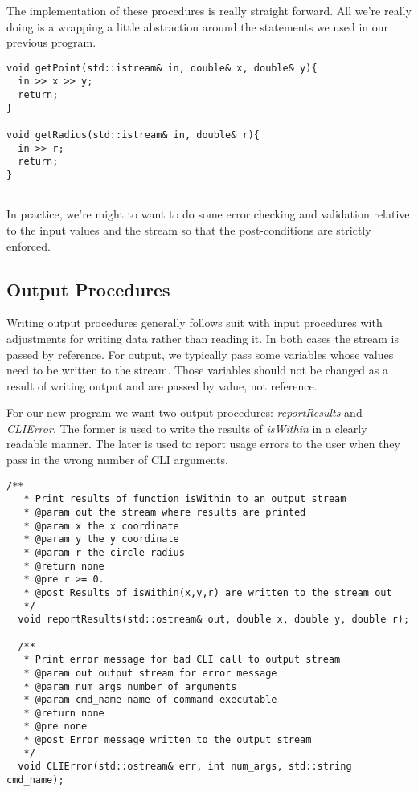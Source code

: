 \documentclass[nobib]{tufte-handout}
\begin{document}
The implementation of these procedures is really straight forward. All we're really doing is a wrapping a little abstraction around the statements we used in our previous program. 
\begin{verbatim}
void getPoint(std::istream& in, double& x, double& y){
  in >> x >> y;
  return;
}

void getRadius(std::istream& in, double& r){
  in >> r;
  return;
}
	
\end{verbatim}
In practice, we're might to want to do some error checking and validation relative to the input values and the stream so that the post-conditions are strictly enforced.

\subsection{Output Procedures}

Writing output procedures generally follows suit with input procedures with adjustments for writing data rather than reading it. In both cases the stream is passed by reference. For output, we typically pass some variables whose values need to be written to the stream. Those variables should not be changed as a result of writing output and are passed by value, not reference. 

For our new program we want two output procedures: \textit{reportResults} and \textit{CLIError}. The former is used to write the results of \textit{isWithin} in a clearly readable manner. The later is used to report usage errors to the user when they pass in the wrong number of CLI arguments. 
\begin{verbatim}
/**
   * Print results of function isWithin to an output stream
   * @param out the stream where results are printed
   * @param x the x coordinate
   * @param y the y coordinate
   * @param r the circle radius
   * @return none
   * @pre r >= 0.
   * @post Results of isWithin(x,y,r) are written to the stream out
   */
  void reportResults(std::ostream& out, double x, double y, double r);

  /**
   * Print error message for bad CLI call to output stream
   * @param out output stream for error message
   * @param num_args number of arguments
   * @param cmd_name name of command executable
   * @return none
   * @pre none
   * @post Error message written to the output stream
   */
  void CLIError(std::ostream& err, int num_args, std::string cmd_name);
\end{verbatim}
\end{document}

